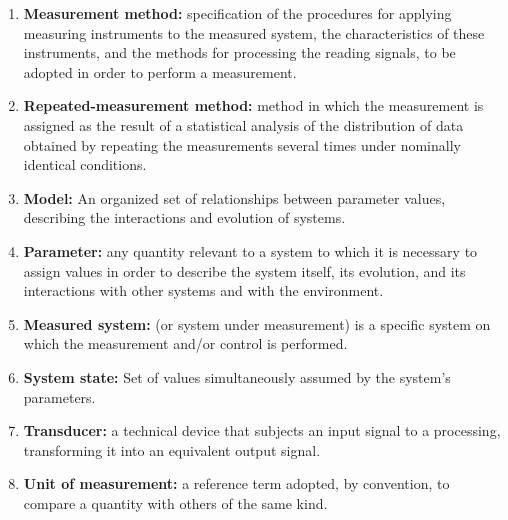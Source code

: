 \documentclass[../main.tex]{subfiles}
\begin{document}
\begin{enumerate}
	\item[\textbf{-}]\textbf{Measurement method:} specification of the procedures for applying measuring instruments to the measured system, the characteristics of these instruments, and the methods for processing the reading signals, to be adopted in order to perform a measurement.

	\item[\textbf{-}]\textbf{Repeated-measurement method:} method in which the measurement is assigned as the result of a statistical analysis of the distribution of data obtained by repeating the measurements several times under nominally identical conditions.
	
	\item[\textbf{-}]\textbf{Model:} An organized set of relationships between parameter values, describing the interactions and evolution of systems. 
	
	\item[\textbf{-}]\textbf{Parameter:} any quantity relevant to a system to which it is necessary to assign values in order to describe the system itself, its evolution, and its interactions with other systems and with the environment.
 
	\item[\textbf{-}]\textbf{Measured system:} (or system under measurement) is a specific system on which the measurement and/or control is performed.

	\item[\textbf{-}]\textbf{System state:} Set of values simultaneously assumed by the system’s parameters.
	\item[\textbf{-}]\textbf{Transducer:} a technical device that subjects an input signal to a processing, transforming it into an equivalent output signal.

	\item[\textbf{-}]\textbf{Unit of measurement:} a reference term adopted, by convention, to compare a quantity with others of the same kind.


\end{enumerate}
\end{document}
